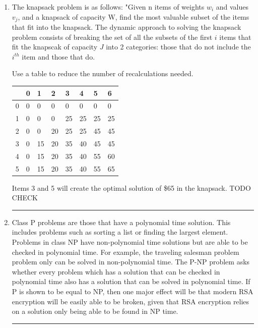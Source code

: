 \documentclass{article}
\begin{document}
\begin{enumerate}
\noindent\rule{8cm}{0.4pt}

\item The knapsack problem is as follows: "Given n items of weights $w_i$ and values $v_j$, and a knapsack of capacity W, find the most valuable subset of the items that fit into the knapsack. The dynamic approach to solving the knapsack problem consists of breaking the set of all the subsets of the first $i$ items that fit the knapscak of capacity $J$ into 2 categories: those that do not include the $i^{th}$ item and those that do. 

Use a table to reduce the number of recalculations needed.

\begin{table}[H]
\begin{tabular}{|l|l|l|l|l|l|l|l|}
\hline
 & 0 & 1 & 2 & 3 & 4 & 5 & 6 \\ \hline
0 & 0 & 0 & 0 & 0 & 0 & 0 & 0 \\ \hline
1 & 0 & 0 & 0 & 25 & 25 & 25 & 25 \\ \hline
2 & 0 & 0 & 20 & 25 & 25 & 45 & 45 \\ \hline
3 & 0 & 15 & 20 & 35 & 40 & 45 & 45 \\ \hline
4 & 0 & 15 & 20 & 35 & 40 & 55 & 60 \\ \hline
5 & 0 & 15 & 20 & 35 & 40 & 55 & 65 \\ \hline
\end{tabular}
\end{table}

Items 3 and 5 will create the optimal solution of \$65 in the knapsack. TODO CHECK  

\noindent\rule{8cm}{0.4pt}

\item Class P problems are those that have a polynomial time solution. This includes problems such as sorting a list or finding the largest element. Problems in class NP have non-polynomial time solutions but are able to be checked in polynomial time. For example, the traveling salesman problem problem only can be solved in non-polynomial time. The P-NP problem asks whether every problem which has a solution that can be checked in polynomial time also has a solution that can be solved in polynomial time. If P is shown to be equal to NP, then one major effect will be that modern RSA encryption will be easily able to be broken, given that RSA encryption relies on a solution only being able to be found in NP time. 

\noindent\rule{8cm}{0.4pt}



\end{enumerate}
\end{document}
